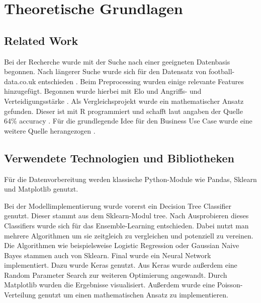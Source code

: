 \chapter{Theoretische Grundlagen}

\section{Related Work}
\autocite[Vgl.][]{Tableau.03112021}

Bei der Recherche wurde mit der Suche nach einer geeigneten Datenbasis begonnen. Nach längerer Suche wurde sich für den Datensatz von football-data.co.uk entschieden \autocite{.03072022}. Beim Preprocessing wurden einige relevante Features hinzugefügt. Begonnen wurde hierbei mit Elo und Angriffs- und Verteidigungsstärke \autocite{Accso.14102021}. Als Vergleichsprojekt wurde ein mathematischer Ansatz gefunden. Dieser ist mit R programmiert und schafft laut angaben der Quelle 64\% accuracy \cite{Doan.15.3.2019}. Für die grundlegende Idee für den Business Use Case wurde eine weitere Quelle herangezogen \cite{Hartley.05102022}.

\section{Verwendete Technologien und Bibliotheken}
Für die Datenvorbereitung werden klassische Python-Module wie Pandas, Sklearn und Matplotlib genutzt.

Bei der Modellimplementierung wurde vorerst ein Decision Tree Classifier genutzt. Dieser stammt aus dem Sklearn-Modul tree. Nach Ausprobieren dieses Classifiers wurde sich für das Ensemble-Learning entschieden. Dabei nutzt man mehrere Algorithmen um sie zeitgleich zu vergleichen und potenziell zu vereinen. Die Algorithmen wie beispielsweise Logistic Regression oder Gaussian Naive Bayes stammen auch von Sklearn. Final wurde ein Neural Network implementiert. Dazu wurde Keras genutzt. Aus Keras wurde außerdem eine Random Parameter Search zur weiteren Optimierung angewandt. Durch Matplotlib wurden die Ergebnisse visualisiert. Außerdem wurde eine Poisson-Verteilung genutzt um einen mathematischen Ansatz zu implementieren.